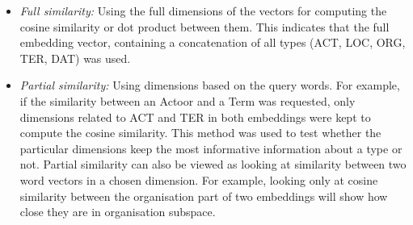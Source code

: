 \begin{itemize}
\item \emph{Full similarity:} Using the full dimensions of the vectors for computing the cosine similarity or dot product between them. This indicates that the full embedding vector, containing a concatenation of all types (ACT, LOC, ORG, TER, DAT) was used. 
\item \emph{Partial similarity:} Using dimensions based on the query words. For example, if the similarity between an Actoor and a Term was requested, only dimensions related to ACT and TER in both embeddings were kept to compute the cosine similarity. This method was used to test whether the particular dimensions keep the most informative information about a type or not. Partial similarity can also be viewed as looking at similarity between two word vectors in a chosen dimension. For example, looking only at cosine similarity between the organisation part of two embeddings will show how close they are in organisation subspace. 
\end{itemize}








